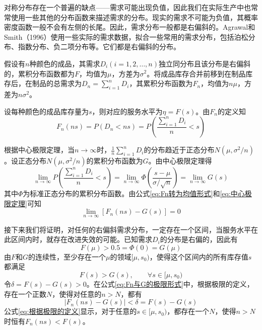 对称分布存在一个普遍的缺点——需求可能出现负值，因此我们在实际生产中也常常使用一些其他的分布函数来描述需求的分布。现实的需求不可能为负值，其概率密度函数一般不会有左侧的长尾。因此，需求分布一般都是右偏斜的。Agrawal和Smith（1996）\cite{agrawal_estimating_1996}使用一些实际的需求数据，拟合一些常用的需求分布，包括泊松分布、指数分布、负二项分布等。它们都是右偏斜的分布。

假设有$n$种颜色的成品，其需求$D_i(i=1,2,\ldots,n)$独立同分布且该分布是右偏斜的，累积分布函数都为$F$，均值为$\mu$，方差为$\sigma^2$。将成品库存合并前移到在制品库存后，在制品的总需求为$D_n=\sum_{i=1}^nD_i$，其累积分布函数为$F_n$，均值为$n\mu$，方差为$n\sigma^2$。

设每种颜色的成品库存量为$s$，则对应的服务水平为$\eta=F(s)$。由$F_n$的定义知
\begin{equation}
F_n(ns) = P(D_n<ns) = P\left(\frac{\sum_{i=1}^nD_i}{n}<s\right)
\label{eq:Fn转为均值形式}
\end{equation}

根据中心极限定理，当$n\to\infty$时，$\frac{1}{n}\sum_{i=1}^nD_i$的分布趋近于正态分布$N(\mu,\sigma^2/n)$。设正态分布$N(\mu,\sigma^2/n)$的累积分布函数为$G$。由中心极限定理得
\begin{equation}
\lim_{n\to\infty}P\left(\frac{\sum_{i=1}^nD_i}{n}<s\right) = \lim_{n\to\infty}\Phi\left(\frac{s-\mu}{\sigma/\sqrt{n}}\right) = \lim_{n\to\infty}G(s)
\label{eq:中心极限定理}
\end{equation}
其中$\Phi$为标准正态分布的累积分布函数。由公式\ref{eq:Fn转为均值形式}和\ref{eq:中心极限定理}可知
\begin{equation}
\lim_{n\to\infty}[F_n(ns)-G(s)]=0
\label{eq:Fn与G的极限形式}
\end{equation}

接下来我们将证明，对任何的右偏斜需求分布，一定存在一个区间，当服务水平在此区间内时，就存在改进失效的可能。已知需求$D_i$的分布是右偏的，因此有
\begin{equation}
F(\mu) > 0.5 = \Phi(0) = G(\mu)
\label{eq:右偏斜的性质}
\end{equation}
由$F$和$G$的连续性，至少存在一个$\mu$的领域$[\mu,s_0)$，使得这个区间内的所有库存值$s$都满足
\[
F(s) > G(s),\qquad \forall s\in[\mu,s_0)
\]
令$\delta=F(s)-G(s)>0$。在公式\ref{eq:Fn与G的极限形式}中，根据极限的定义，存在一个正数$N$，使得对任意的$n>N$，都有
\begin{equation}
|F_n(ns)-G(s)| < \delta = F(s) - G(s)
\label{eq:根据极限的定义}
\end{equation}
公式\ref{eq:根据极限的定义}显示，对于任意的$s\in[\mu,s_0)$，都存在一个$N$，使得$n>N$时恒有$F_n(ns)<F(s)$。

